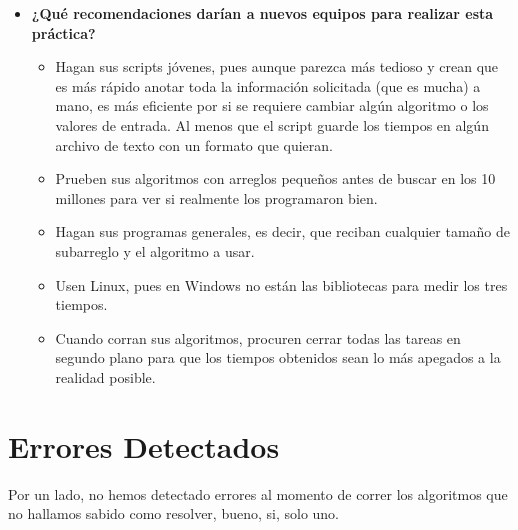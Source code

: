 \documentclass[12pt, fleqn]{article}                             %
\theoremstyle{break}                                            %
\begin{document}
\begin{itemize}
\begin{itemize}
                \end{itemize}

            \clearpage

            \item 
                \textbf{¿Qué recomendaciones darían a nuevos equipos para realizar esta práctica?}
                
                \begin{itemize}\setlength\itemsep{0em}
                    \item Hagan sus scripts jóvenes, pues aunque parezca más tedioso y crean que es más rápido
                        anotar toda la información solicitada (que es mucha) a mano, es más eficiente por si se
                        requiere cambiar algún algoritmo o los valores de entrada. Al menos que el script guarde
                        los tiempos en algún archivo de texto con un formato que quieran.
                    \item Prueben sus algoritmos con arreglos pequeños antes de buscar en los 10 millones para ver
                        si realmente los programaron bien.
                    \item Hagan sus programas generales, es decir, que reciban cualquier tamaño de subarreglo y
                        el algoritmo a usar.
                    \item Usen Linux, pues en Windows no están las bibliotecas para medir los tres tiempos.
                    \item Cuando corran sus algoritmos, procuren cerrar todas las tareas en segundo plano para
                        que los tiempos obtenidos sean lo más apegados a la realidad posible.
                \end{itemize}

        \end{itemize}




\clearpage
\section{Errores Detectados}

    Por un lado, no hemos detectado errores al momento de correr los algoritmos
    que no hallamos sabido como resolver, bueno, si, solo uno.
\end{document}
